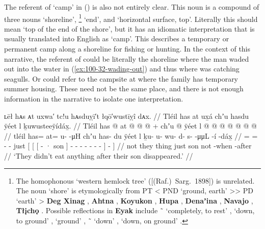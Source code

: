 \label{note:100-shore-discussion}
The referent of  ‘camp’ in (\lastx) is also not entirely clear.
This noun is a compound of three nouns  ‘shoreline’, \footnote{The homophonous  ‘western hemlock tree’ ([(Raf.)\ Sarg.\ 1898]) is unrelated.
The noun  ‘shore’ is etymologically from PT  < PND  ‘ground, earth’ >> PD  ‘earth’ > \textbf{Deg Xinag}  \parencite[42]{kari:1978}, \textbf{Ahtna}  \parencite[301]{kari:1990}, \textbf{Koyukon}  \parencite[474]{jette-jones:2000}, \textbf{Hupa}  \parencite[30]{golla:1996}, \textbf{Denaʼina}  \parencite[136]{kari:2007}, \textbf{Navajo}  \parencite[637]{young-morgan:1987}, \textbf{Tłįchǫ}  \parencite[86]{saxon-siemens:1996}.
Possible reflections in \textbf{Eyak} include  \~\  ‘completely, to rest’ \parencite[2475]{krauss:1970},  ‘down, to ground’ \parencite[2516]{krauss:1970},  ‘ground’ \parencite[2521]{krauss:1970},  \~\  ‘down’ \parencite[2524]{krauss:1970},  ‘down, on ground’ \parencite[2224]{krauss:1970}.}  ‘end’, and  ‘horizontal surface, top’.
Literally this should mean ‘top of the end of the shore’, but it has an idiomatic interpretation that is usually translated into English as ‘camp’.
This describes a temporary or permanent camp along a shoreline for fishing or hunting.
In the context of this narrative, the referent of  could be literally the shoreline where the man waded out into the water in (\ref{ex:100-32-wading-out}) and thus where  was catching seagulls.
Or  could refer to the campsite at  where the family has temporary summer housing.
These need not be the same place, and there is not enough information in the narrative to isolate one interpretation.

\ex\label{ex:100-36-dont-eat}%
%
\begingl
	\glpreamble	ʟēł hᴀs ᴀt uxwa′ tc!u hᴀsduỵī′t łqō′wustīỵî dᴀx. //
	\glpreamble	Tléil has at ux̱á chʼu hasdu ÿéet l ḵuwusteeÿídáx̱. //
	\gla	Tléil has @ at @  @ {} @ {} +
			chʼu {} {} {}  @ {} ÿéet {}
			l  @ {} @ {} @ {} @ {} @ {} @ {} @ {} {} {} {} //
	\glb	tléil has= at= u-  -μH
		chʼu {} {} {} has- du ÿéet {}
		l ḵu- u- wu- d- s-  -μμL -í {} -dáx̱ {} //
	\glc	{} = = -  -
		just {}[ {}[ {}[ - · son {}]
		 - - - - - 
			- - {}] - {}] //
	\gld	not they thing  {} {}
		just {} {} {}  {} son {}
		not  {} {} {} {} {} {} -when {} -after {} //
	\glft	‘They didn’t eat anything after their son disappeared.’
		//
\endgl
\xe

